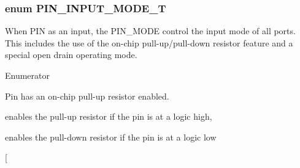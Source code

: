 \hypertarget{group___enumerations_ga9f8f32709b482732d6e377ff26da36ef}{
\subsubsection[{P\-I\-N\-\_\-\-I\-N\-P\-U\-T\-\_\-\-M\-O\-D\-E\-\_\-\-T}]{\setlength{\rightskip}{0pt plus 5cm}enum {\bf P\-I\-N\-\_\-\-I\-N\-P\-U\-T\-\_\-\-M\-O\-D\-E\-\_\-\-T}}}\label{group___enumerations_ga9f8f32709b482732d6e377ff26da36ef}
When P\-I\-N as an input, the P\-I\-N\-\_\-\-M\-O\-D\-E control the input mode of all ports. This includes the use of the on-\/chip pull-\/up/pull-\/down resistor feature and a special open drain operating mode. \begin{Desc}
\item[Enumerator]\par
\begin{description}
\item[{\em 
\hypertarget{group___enumerations_gga9f8f32709b482732d6e377ff26da36efa781a7f23ae9b0dbdc6edfdcfd3be75df}{I\-N\-T\-E\-R\-N\-A\-L\-\_\-\-P\-U\-L\-L\-\_\-\-U\-P}\label{group___enumerations_gga9f8f32709b482732d6e377ff26da36efa781a7f23ae9b0dbdc6edfdcfd3be75df}
}]Pin has an on-\/chip pull-\/up resistor enabled. \item[{\em 
\hypertarget{group___enumerations_gga9f8f32709b482732d6e377ff26da36efa415b70b8108c51e396b88eeeaa0ffb1a}{R\-E\-P\-E\-A\-T\-E\-R}\label{group___enumerations_gga9f8f32709b482732d6e377ff26da36efa415b70b8108c51e396b88eeeaa0ffb1a}
}]enables the pull-\/up resistor if the pin is at a logic high, \par
 enables the pull-\/down resistor if the pin is at a logic low \item[{\em 
}
\end{description}
\end{Desc}
